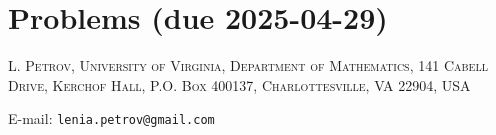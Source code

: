 \documentclass[letterpaper,11pt,oneside,reqno]{article}
\numberwithin{equation}{section}
\theoremstyle{definition}
\begin{document}
\appendix
\setcounter{section}{9}

\section{Problems (due 2025-04-29)}









\medskip

\textsc{L. Petrov, University of Virginia, Department of Mathematics, 141 Cabell Drive, Kerchof Hall, P.O. Box 400137, Charlottesville, VA 22904, USA}

E-mail: \texttt{lenia.petrov@gmail.com}
\end{document}
